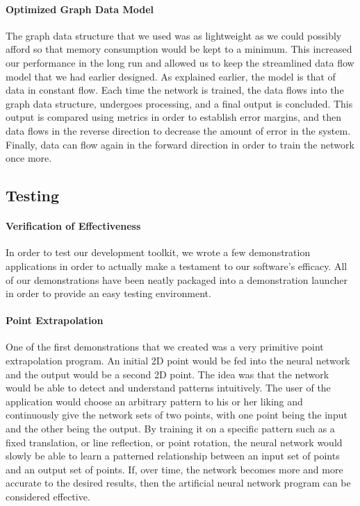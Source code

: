 \documentclass[letterpaper, 10pt]{article}
\begin{document}
		\paragraph{Optimized Graph Data Model}
		The graph data structure that we used was as lightweight as we could possibly afford so that memory consumption would be kept to a minimum. This increased our performance in the long run and allowed us to keep the streamlined data flow model that we had earlier designed. As explained earlier, the model is that of data in constant flow. Each time the network is trained, the data flows into the graph data structure, undergoes processing, and a final output is concluded. This output is compared using metrics in order to establish error margins, and then data flows in the reverse direction to decrease the amount of error in the system. Finally, data can flow again in the forward direction in order to train the network once more.
	\subsection{Testing}
		\paragraph{Verification of Effectiveness}
		In order to test our development toolkit, we wrote a few demonstration applications in order to actually make a testament to our software's efficacy. All of our demonstrations have been neatly packaged into a demonstration launcher in order to provide an easy testing environment. 
		
		\paragraph{Point Extrapolation}
		One of the first demonstrations that we created was a very primitive point extrapolation program. An initial 2D point would be fed into the neural network and the output would be a second 2D point. The idea was that the network would be able to detect and understand patterns intuitively. The user of the application would choose an arbitrary pattern to his or her liking and continuously give the network sets of two points, with one point being the input and the other being the output. By training it on a specific pattern such as a fixed translation, or line reflection, or point rotation, the neural network would slowly be able to learn a patterned relationship between an input set of points and an output set of points. If, over time, the network becomes more and more accurate to the desired results, then the artificial neural network program can be considered effective.
		
\end{document}
